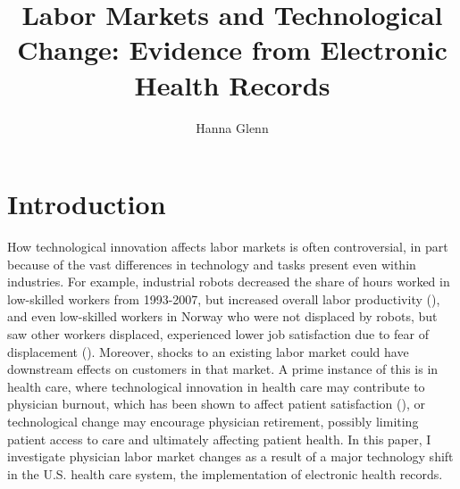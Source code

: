 \documentclass[11pt]{article}
\title{Labor Markets and Technological Change: Evidence from Electronic Health Records}
\author{Hanna Glenn}
\begin{document}
\maketitle



\vspace{1.5cm}

\section{Introduction}

How technological innovation affects labor markets is often controversial, in part because of the vast differences in technology and tasks present even within industries. For example, industrial robots decreased the share of hours worked in low-skilled workers from 1993-2007, but increased overall labor productivity  (\cite{graetz2018robots}), and even low-skilled workers in Norway who were not displaced by robots, but saw other workers displaced, experienced lower job satisfaction due to fear of displacement (\cite{schwabe2020automation}). Moreover, shocks to an existing labor market could have downstream effects on customers in that market. A prime instance of this is in health care, where technological innovation in health care may contribute to physician burnout, which has been shown to affect patient satisfaction (\cite{shanafelt2002burnout}), or technological change may encourage physician retirement, possibly limiting patient access to care and ultimately affecting patient health. In this paper, I investigate physician labor market changes as a result of a major technology shift in the U.S. health care system, the implementation of electronic health records.
\end{document}
